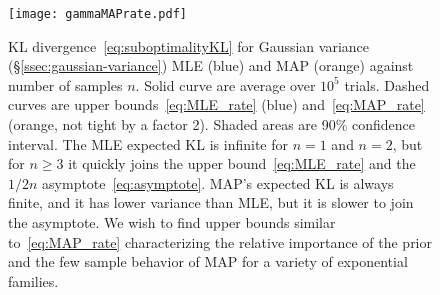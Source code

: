 
\begin{figure}[h]
	\centering
\texttt{[image: gammaMAPrate.pdf]}
	\caption{\vspace{-5ex}KL divergence~\eqref{eq:suboptimalityKL} for Gaussian variance (\S\ref{ssec:gaussian-variance}) MLE (blue) and MAP (orange) against number of samples $n$. 
		Solid curve  are average over $10^5$ trials.
		Dashed curves are upper bounds~\eqref{eq:MLE_rate} (blue) and~\eqref{eq:MAP_rate} (orange, not tight by a factor 2).
		Shaded areas are 90\% confidence interval.
		The MLE expected KL is infinite for $n=1$ and $n=2$, but for $n\geq3$ it quickly joins the upper bound~\eqref{eq:MLE_rate} and the $1/2n$ asymptote~\eqref{eq:asymptote}.
		MAP's expected KL is always finite, and it has lower variance than MLE, but it is slower to join the asymptote.
		We wish to find upper bounds similar to~\eqref{eq:MAP_rate} characterizing the relative importance of the prior and the few sample behavior of MAP for a variety of exponential families.
	}
	\label{fig:curves}
\end{figure}



